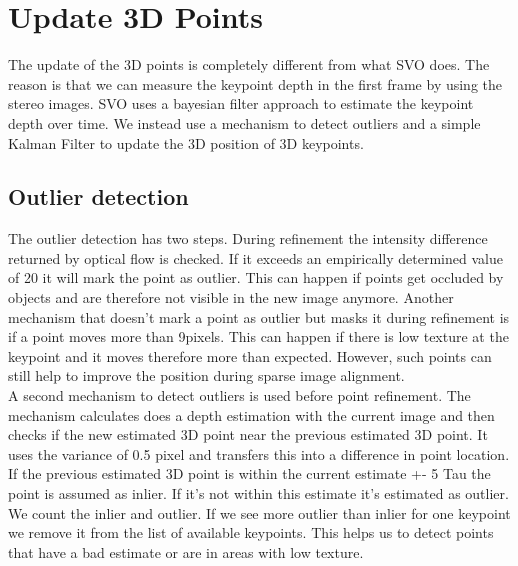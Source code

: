 \documentclass[11pt,a4paper,titlepage,oneside]{report}
\begin{document}
\section{Update 3D Points}

The update of the 3D points is completely different from what SVO \cite{svo} does. The reason is that we can measure the keypoint depth in the first frame by using the stereo images. SVO uses a bayesian filter approach to estimate the keypoint depth over time. We instead use a mechanism to detect outliers and a simple Kalman Filter to update the 3D position of 3D keypoints.

\subsection{Outlier detection}
The outlier detection has two steps. During refinement the intensity difference returned by optical flow is checked. If it exceeds an empirically determined value of 20 it will mark the point as outlier. This can happen if points get occluded by objects and are therefore not visible in the new image anymore. Another mechanism that doesn't mark a point as outlier but masks it during refinement is if a point moves more than 9pixels. This can happen if there is low texture at the keypoint and it moves therefore more than expected. However, such points can still help to improve the position during sparse image alignment.\\
A second mechanism to detect outliers is used before point refinement. The mechanism calculates does a depth estimation with the current image and then checks if the new estimated 3D point near the previous estimated 3D point. It uses the variance of 0.5 pixel and transfers this into a difference in point location. If the previous estimated 3D point is within the current estimate +- 5 Tau the point is assumed as inlier. If it's not within this estimate it's estimated as outlier. We count the inlier and outlier. If we see more outlier than inlier for one keypoint we remove it from the list of available keypoints. This helps us to detect points that have a bad estimate or are in areas with low texture.
\end{document}
